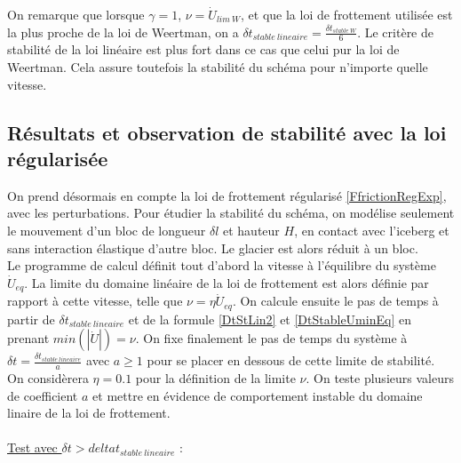 \documentclass[11pt, a4paper]{article}
\begin{document}
On remarque que lorsque $\gamma = 1$, $\nu = \dot{U}_{lim \ W}$, et que la loi de frottement utilisée est la plus proche de la loi de Weertman, on a $\delta t_{stable \ lineaire} = \frac{\delta t_{stable \ W} }{6}$. Le critère de stabilité de la loi linéaire est plus fort dans ce cas que celui pur la loi de Weertman. Cela assure toutefois la stabilité du schéma pour n'importe quelle vitesse. 
\subsection{Résultats et observation de stabilité avec la loi régularisée}
On prend désormais en compte la loi de frottement régularisé \ref{FfrictionRegExp}, avec les perturbations. Pour étudier la stabilité du schéma, on modélise seulement le mouvement d'un bloc de longueur $\delta l$ et hauteur $H$, en contact avec l'iceberg et sans interaction élastique d'autre bloc. Le glacier est alors réduit à un bloc. 
\\

Le programme de calcul définit tout d'abord la vitesse à l'équilibre du système $\dot{U}_{eq}$. La limite du domaine linéaire de la loi de frottement est alors définie par rapport à cette vitesse, telle que $\nu = \eta \dot{U}_{eq}$. On calcule ensuite le pas de temps à partir de $\delta t_{stable \ lineaire}$ et de la formule \ref{DtStLin2} et \ref{DtStableUminEq} en prenant $min(|\dot{U}|) = \nu$. On fixe finalement le pas de temps du système à $\delta t = \frac{\delta t_{stable \ lineaire} }{a} $ avec $a \geq 1$ pour se placer en dessous de cette limite de stabilité. 
\\

On considèrera $\eta= 0.1$ pour la définition de la limite $\nu$. On teste plusieurs valeurs de coefficient $a$ et mettre en évidence de comportement instable du domaine linaire de la loi de frottement.
\\
\\
\underline{Test avec $\delta t > delta t_{stable \ lineaire}$} :
\\
\end{document}
